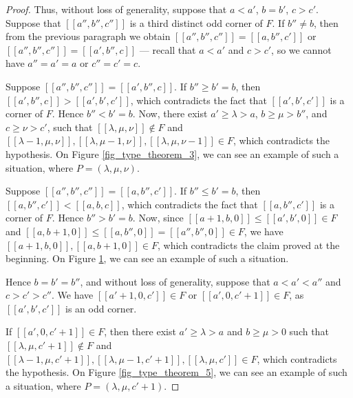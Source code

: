 \documentclass[10pt,a4paper]{amsart}
\begin{document}
\begin{proof}
    
    Thus, without loss of generality, suppose that $a < a'$, $b = b'$, $c > c'$.  Suppose that $[[a'',b'',c'']]$ is a third distinct odd corner of $F$. If $b'' \neq b$, then from the previous paragraph
    we obtain $[[a'',b'',c'']] = [[a,b'',c']]$ or $[[a'',b'',c'']] = [[a',b'',c]]$ --- recall that $a < a'$ and $c > c'$, so we cannot have $a'' = a' = a$ or $c'' = c' = c$. 



    
    Suppose $[[a'',b'',c'']] = [[a',b'',c]]$. If $b'' \geq b' = b$, then $[[a',b'',c]] >[[a',b',c']]$, which contradicts the fact that $[[a',b',c']]$ is a corner of $F$. Hence $ b'' < b' = b$. Now, there exist $a' \geq \lambda > a$, $b \geq \mu > b''$, and $c \geq \nu > c'$, such that $[[\lambda,\mu,\nu]] \notin F$ and $[[\lambda-1,\mu,\nu]],[[\lambda,\mu-1,\nu]],[[\lambda,\mu,\nu-1]] \in F$, which contradicts the hypothesis. On Figure \ref{fig_type_theorem_3}, we can see an example of such a situation, where $P = (\lambda,\mu,\nu)$. 
    
    Suppose $[[a'',b'',c'']] = [[a,b'',c']]$. If $ b'' \leq b'=b $, then $[[a,b'',c']] < [[a,b,c]]$, which contradicts the fact that $ [[a,b'',c']]$ is a corner of $F$. Hence $b'' > b' =b$. Now, since $[[a+1,b,0]] \leq [[a',b',0]] \in F$ and $ [[a,b+1,0]] \leq [[a,b'',0]] = [[a'',b'',0]] \in F$, we have $[[a+1,b,0]], [[a,b+1,0]] \in F$, which contradicts the claim proved at the beginning. On Figure \ref{fig_type_theorem_4}, we can see an example of such a situation. 

\begin{figure}[h]
    \centering
    \begin{minipage}[t]{0.48\textwidth}
        \centering
        
        \caption{}
        \label{fig_type_theorem_3}
    \end{minipage}
    \begin{minipage}[t]{0.48\textwidth}
        \centering
        
        \caption{}
        \label{fig_type_theorem_4}
    \end{minipage}
\end{figure}


    
    Hence $b= b' = b'' $, and without loss of generality, suppose that
    $a < a' < a''$ and $c > c' > c''$. We have $[[a'+1,0,c']] \in F$ or $[[a',0,c'+1]] \in F$, as $[[a',b',c']]$ is an odd corner. 
    
    If $[[a',0,c'+1]] \in F$, then there exist $a' \geq \lambda > a$ and $b \geq \mu > 0$ such that $[[\lambda,\mu,c'+1]] \notin F$ and $[[\lambda-1,\mu,c'+1]], [[\lambda,\mu-1,c'+1]], [[\lambda,\mu,c']] \in F$, which contradicts the hypothesis. On Figure \ref{fig_type_theorem_5}, we can see an example of such a situation, where $P = (\lambda,\mu,c'+1)$.


\end{proof}
\end{document}
